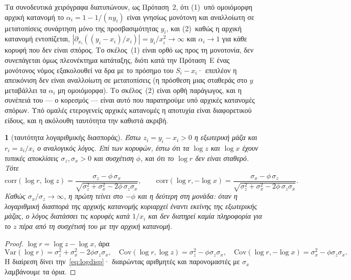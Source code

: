 \documentclass[11pt,a4paper]{article}
\theoremstyle{definition}
\theoremstyle{plain}
\newcommand{\genpropname}{}
\newtheorem*{genprop}{\genpropname}
\newenvironment{prop}[1]{\renewcommand{\genpropname}{Πρόταση #1}\begin{genprop}}{\end{genprop}}
\begin{document}
Τα συνοδευτικά χειρόγραφα διατυπώνουν, ως Πρόταση~2, ότι (1)~υπό ομοιόμορφη αρχική κατανομή το $\alpha_i=1-1/(ny_i)$ είναι γνησίως μονότονη και αναλλοίωτη σε μετατοπίσεις συνάρτηση μόνο της προσβασιμότητας $y_i$, και (2)~καθώς η αρχική κατανομή εντοπίζεται, $|\partial_{x_i}((y_i-x_i)/x_i)|=y_i/x_i^2\to\infty$ και $\alpha_i\to1$ για κάθε κορυφή που δεν είναι σπόρος. Το σκέλος~(1) είναι ορθό ως προς τη μονοτονία, δεν συνεπάγεται όμως πλεονέκτημα κατάταξης, διότι κατά την Πρόταση~E ένας μονότονος νόμος εξακολουθεί να δρα με το πρόσημο του $S_i-x_i$· επιπλέον η απεικόνιση δεν είναι αναλλοίωτη σε μετατοπίσεις (η πρόσθεση μιας σταθεράς στο $y$ μεταβάλλει τα $\alpha_i$ μη ομοιόμορφα). Το σκέλος~(2) είναι ορθή παράγωγος, και η συνέπειά του --- ο κορεσμός --- είναι αυτό που παρατηρούμε υπό αρχικές κατανομές σπόρων. Υπό ομαλές ετερογενείς αρχικές κατανομές η αποτυχία είναι διαφορετικού είδους, και η ακόλουθη ταυτότητα την καθιστά ακριβή.

\begin{prop}{$2'$}[ταυτότητα λογαριθμικής διασποράς]
Έστω $z_i=y_i-x_i>0$ η εξωτερική μάζα και $r_i=z_i/x_i$ ο αναλογικός λόγος. Επί των κορυφών, έστω ότι τα $\log z$ και $\log x$ έχουν τυπικές αποκλίσεις $\sigma_z,\sigma_x>0$ και συσχέτιση $\phi$, και ότι το $\log r$ δεν είναι σταθερό. Τότε
\begin{equation}\label{eq:logdisp}
\mathrm{corr}(\log r,\log z)=\frac{\sigma_z-\phi\,\sigma_x}{\sqrt{\sigma_z^2+\sigma_x^2-2\phi\,\sigma_z\sigma_x}},\qquad
\mathrm{corr}(\log r,-\log x)=\frac{\sigma_x-\phi\,\sigma_z}{\sqrt{\sigma_z^2+\sigma_x^2-2\phi\,\sigma_z\sigma_x}} .
\end{equation}
Καθώς $\sigma_x/\sigma_z\to\infty$, η πρώτη τείνει στο $-\phi$ και η δεύτερη στη μονάδα: όταν η λογαριθμική διασπορά της αρχικής κατανομής κυριαρχεί έναντι εκείνης της εξωτερικής μάζας, ο λόγος διατάσσει τις κορυφές κατά $1/x_i$ και δεν διατηρεί καμία πληροφορία για το $z$ πέρα από τη συσχέτισή του με την αρχική κατανομή.
\end{prop}

\begin{proof}
$\log r=\log z-\log x$, άρα
\[
\mathrm{Var}(\log r)=\sigma_z^2+\sigma_x^2-2\phi\sigma_z\sigma_x,\quad
\mathrm{Cov}(\log r,\log z)=\sigma_z^2-\phi\sigma_z\sigma_x,\quad
\mathrm{Cov}(\log r,-\log x)=\sigma_x^2-\phi\sigma_z\sigma_x.
\]
Η διαίρεση δίνει την~\eqref{eq:logdisp}· διαιρώντας αριθμητές και παρονομαστές με $\sigma_x$ λαμβάνουμε τα όρια.
\end{proof}
\end{document}
